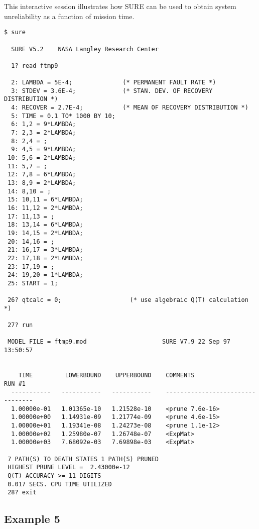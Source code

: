 This interactive session illustrates how SURE can be used to obtain system
unreliability as a function of mission time.
\begin{verbatim}
$ sure

  SURE V5.2    NASA Langley Research Center

  1? read ftmp9

  2: LAMBDA = 5E-4;              (* PERMANENT FAULT RATE *)
  3: STDEV = 3.6E-4;             (* STAN. DEV. OF RECOVERY DISTRIBUTION *)
  4: RECOVER = 2.7E-4;           (* MEAN OF RECOVERY DISTRIBUTION *)
  5: TIME = 0.1 TO* 1000 BY 10;
  6: 1,2 = 9*LAMBDA;
  7: 2,3 = 2*LAMBDA;
  8: 2,4 = ;
  9: 4,5 = 9*LAMBDA;
 10: 5,6 = 2*LAMBDA;
 11: 5,7 = ;
 12: 7,8 = 6*LAMBDA;
 13: 8,9 = 2*LAMBDA;
 14: 8,10 = ;
 15: 10,11 = 6*LAMBDA;
 16: 11,12 = 2*LAMBDA;
 17: 11,13 = ;
 18: 13,14 = 6*LAMBDA;
 19: 14,15 = 2*LAMBDA;
 20: 14,16 = ;
 21: 16,17 = 3*LAMBDA;
 22: 17,18 = 2*LAMBDA;
 23: 17,19 = ;
 24: 19,20 = 1*LAMBDA;
 25: START = 1;

 26? qtcalc = 0;                   (* use algebraic Q(T) calculation *) 

 27? run

 MODEL FILE = ftmp9.mod                     SURE V7.9 22 Sep 97  13:50:57


    TIME         LOWERBOUND    UPPERBOUND    COMMENTS                 RUN #1
  -----------   -----------   -----------    ---------------------------------
  1.00000e-01   1.01365e-10   1.21528e-10    <prune 7.6e-16>
  1.00000e+00   1.14931e-09   1.21774e-09    <prune 4.6e-15>
  1.00000e+01   1.19341e-08   1.24273e-08    <prune 1.1e-12>
  1.00000e+02   1.25980e-07   1.26748e-07    <ExpMat>
  1.00000e+03   7.68092e-03   7.69898e-03    <ExpMat>

 7 PATH(S) TO DEATH STATES 1 PATH(S) PRUNED
 HIGHEST PRUNE LEVEL =  2.43000e-12
 Q(T) ACCURACY >= 11 DIGITS
 0.017 SECS. CPU TIME UTILIZED
 28? exit
\end{verbatim}

\subsection{Example 5 }

